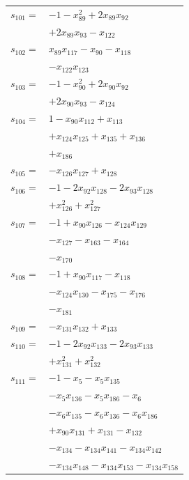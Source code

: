 \begin{longtable}{@{}r@{\;}l@{}}
\(s_{101}=\) & \(\displaystyle -1 -x_{89}^{2} +2x_{89}x_{92}\) \\
 & \(\displaystyle +2x_{89}x_{93} -x_{122}\) \\[3pt]
\(s_{102}=\) & \(\displaystyle x_{89}x_{117} -x_{90} -x_{118}\) \\
 & \(\displaystyle -x_{122}x_{123}\) \\[3pt]
\(s_{103}=\) & \(\displaystyle -1 -x_{90}^{2} +2x_{90}x_{92}\) \\
 & \(\displaystyle +2x_{90}x_{93} -x_{124}\) \\[3pt]
\(s_{104}=\) & \(\displaystyle 1 -x_{90}x_{112} +x_{113}\) \\
 & \(\displaystyle +x_{124}x_{125} +x_{135} +x_{136}\) \\
 & \(\displaystyle +x_{186}\) \\[3pt]
\(s_{105}=\) & \(\displaystyle -x_{126}x_{127} +x_{128}\) \\[3pt]
\(s_{106}=\) & \(\displaystyle -1 -2x_{92}x_{128} -2x_{93}x_{128}\) \\
 & \(\displaystyle +x_{126}^{2} +x_{127}^{2}\) \\[3pt]
\(s_{107}=\) & \(\displaystyle -1 +x_{90}x_{126} -x_{124}x_{129}\) \\
 & \(\displaystyle -x_{127} -x_{163} -x_{164}\) \\
 & \(\displaystyle -x_{170}\) \\[3pt]
\(s_{108}=\) & \(\displaystyle -1 +x_{90}x_{117} -x_{118}\) \\
 & \(\displaystyle -x_{124}x_{130} -x_{175} -x_{176}\) \\
 & \(\displaystyle -x_{181}\) \\[3pt]
\(s_{109}=\) & \(\displaystyle -x_{131}x_{132} +x_{133}\) \\[3pt]
\(s_{110}=\) & \(\displaystyle -1 -2x_{92}x_{133} -2x_{93}x_{133}\) \\
 & \(\displaystyle +x_{131}^{2} +x_{132}^{2}\) \\[3pt]
\(s_{111}=\) & \(\displaystyle -1 -x_{5} -x_{5}x_{135}\) \\
 & \(\displaystyle -x_{5}x_{136} -x_{5}x_{186} -x_{6}\) \\
 & \(\displaystyle -x_{6}x_{135} -x_{6}x_{136} -x_{6}x_{186}\) \\
 & \(\displaystyle +x_{90}x_{131} +x_{131} -x_{132}\) \\
 & \(\displaystyle -x_{134} -x_{134}x_{141} -x_{134}x_{142}\) \\
 & \(\displaystyle -x_{134}x_{148} -x_{134}x_{153} -x_{134}x_{158}\) \\

\end{longtable}
